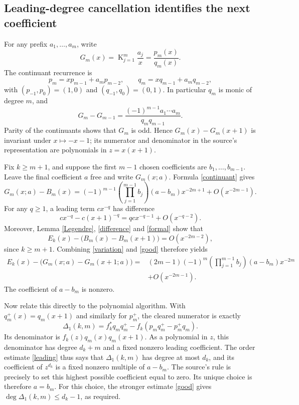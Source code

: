 \documentclass[11pt]{article}
\newcommand{\CF}[2]{\mathop{\mathrm K}_{j=1}^{#1}\frac{#2_j}{x}}
\begin{document}
\subsection*{Leading-degree cancellation identifies the next coefficient}
For any prefix \(a_1,\ldots,a_m\), write
\[
 G_m(x)=\CF{m}{a}=\frac{p_m(x)}{q_m(x)}.
\]
The continuant recurrence is
\[
 p_m=xp_{m-1}+a_mp_{m-2},\qquad
 q_m=xq_{m-1}+a_mq_{m-2},
\]
with \((p_{-1},p_0)=(1,0)\) and \((q_{-1},q_0)=(0,1)\).
In particular \(q_m\) is monic of degree \(m\), and
\begin{equation}\label{continuant}
 G_m-G_{m-1}
 =\frac{(-1)^{m-1}a_1\cdots a_m}{q_mq_{m-1}}.
\end{equation}
Parity of the continuants shows that \(G_m\) is odd.
Hence \(G_m(x)-G_m(x+1)\) is invariant under \(x\mapsto-x-1\);
its numerator and denominator in the source's representation
are polynomials in \(z=x(x+1)\).

Fix \(k\geq m+1\), and suppose the first \(m-1\) chosen coefficients
are \(b_1,\ldots,b_{m-1}\). Leave the final coefficient \(a\) free
and write \(G_m(x;a)\). Formula \eqref{continuant} gives
\begin{equation}\label{variation}
 G_m(x;a)-B_m(x)
 =(-1)^{m-1}\!\left(\prod_{j=1}^{m-1}b_j\right)
 (a-b_m)x^{-2m+1}+O(x^{-2m-1}).
\end{equation}
For any \(q\geq1\), a leading term \(c x^{-q}\) has difference
\[
 c x^{-q}-c(x+1)^{-q}=q c x^{-q-1}+O(x^{-q-2}).
\]
Moreover, Lemma \ref{Legendre}, \eqref{difference} and
\eqref{formal} show that
\begin{equation}\label{good}
 E_k(x)-\bigl(B_m(x)-B_m(x+1)\bigr)=O(x^{-2m-2}),
\end{equation}
since \(k\geq m+1\). Combining \eqref{variation} and \eqref{good}
therefore yields
\begin{align}
 E_k(x)-\bigl(G_m(x;a)-G_m(x+1;a)\bigr)
 ={}&(2m-1)(-1)^m
 \left(\prod_{j=1}^{m-1}b_j\right)(a-b_m)x^{-2m}\nonumber\\
 &+O(x^{-2m-1}).                                        \label{leading}
\end{align}
The coefficient of \(a-b_m\) is nonzero.

Now relate this directly to the polynomial algorithm.
With \(q_m^+(x)=q_m(x+1)\) and similarly for \(p_m^+\), the
cleared numerator is exactly
\[
 \Delta_1(k,m)=f_k^*q_mq_m^+
              -f_k(p_mq_m^+-p_m^+q_m).
\]
Its denominator is \(f_k(z)q_m(x)q_m(x+1)\).
As a polynomial in \(z\), this denominator has degree \(d_k+m\)
and a fixed nonzero leading coefficient. The order estimate
\eqref{leading} thus says that \(\Delta_1(k,m)\) has degree at
most \(d_k\), and its coefficient of \(z^{d_k}\) is a fixed
nonzero multiple of \(a-b_m\).
The source's rule is precisely to set this highest possible
coefficient equal to zero. Its unique choice is therefore \(a=b_m\).
For this choice, the stronger estimate \eqref{good} gives
\(\deg\Delta_1(k,m)\leq d_k-1\), as required.
\end{document}
